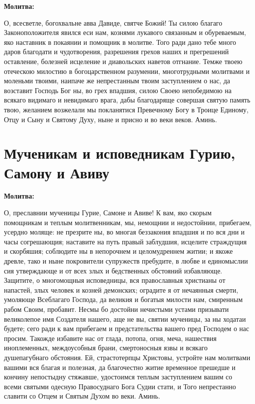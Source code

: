 \medskip


\bfseries Молитва:\normalfont{}


О, всесветле, богохвальне авва Давиде, святче Божий! Ты силою благаго Законоположителя явился еси нам, кознями лукавого связанным и обуреваемым, яко наставник в покаянии и помощник в молитве. Того ради дано тебе много даров благодати и чудотворения, разрешения грехов наших и прегрешений оставление, болезней исцеление и диавольских наветов отгнание. Темже твоею отеческою милостию в богоцарственном разумении, многотрудными молитвами и моленьми твоими, наипаче же непрестанным твоим заступлением о нас, да возставит Господь Бог ны, во грех впадшия, силою Своею непобедимою на всякаго видимаго и невидимаго врага, дабы благодаряще совершая святую память твою, желанием возжелали мы покланятися Превечному Богу в Троице Единому, Отцу и Сыну и Святому Духу, ныне и присно и во веки веков. Аминь.


\bigskip\bigskip\mychapterending


 

\section{Мученикам и исповедникам Гурию, Самону и Авиву}
 


\bfseries Молитва:\normalfont{}


О, преславнии мученицы Гурие, Самоне и Авиве! К вам, яко скорым помощникам и теплым молитвенникам, мы, немощнии и недостойнии, прибегаем, усердно моляще: не презрите ны, во многая беззакония впадшия и по вся дни и часы согрешающия; наставите на путь правый заблудшия, исцелите страждущия и скорбяшия; соблюдите ны в непорочнем и целомудреннем житии; и якоже древле, тако и ныне покровители супружеств пребудите, в любве и единомыслии сия утверждающе и от всех злых и бедственных обстояний избавляюще. Защитите, о многомощныя исповедницы, вся православныя христианы от напастей, злых человек и козней демонских; оградите я от нечаянныя смерти, умоляюще Всеблагаго Господа, да великия и богатыя милости нам, смиренным рабом Своим, пробавит. Несмы бо достойни нечистыми устами призывати великолепое имя Создателя нашего, аще не вы, святии мученицы, за ны ходатаи будете; сего ради к вам прибегаем и предстательства вашего пред Господем о нас просим. Такожде избавите нас от глада, потопа, огня, меча, нашествия иноплеменных, междоусобныя брани, смертоносныя язвы и всякаго душепагубнаго обстояния. Ей, страстотерпцы Христовы, устройте нам молитвами вашими вся благая и полезная, да благочестно житие временное прешедше и кончину непостыдну стяжавше, удостоимся теплым заступлением вашим со всеми святыми одесную Правосуднаго Бога Судии стати, и Того непрестанно славити со Отцем и Святым Духом во веки. Аминь.


